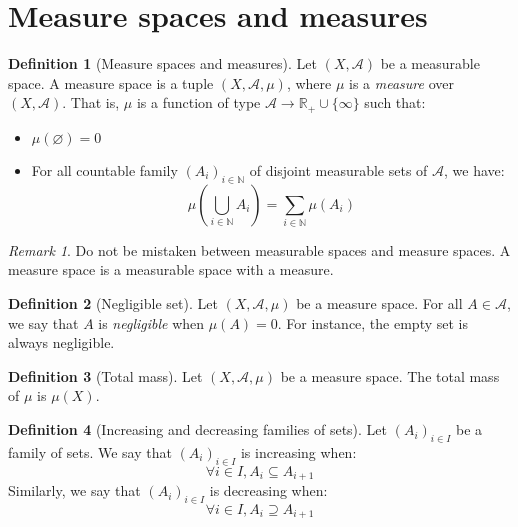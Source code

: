 \documentclass{article}
\theoremstyle{definition}
\newtheorem{definition}{Definition}[section]
\theoremstyle{remark}
\newtheorem*{remark}{Remark}
\theoremstyle{example}
\begin{document}
\section{Measure spaces and measures}

\begin{definition}[Measure spaces and measures]
    Let $(X, \mathcal{A})$ be a measurable space. A measure space is a tuple $(X, \mathcal{A}, \mu)$, where $\mu$ is a \textit{measure} over $(X, \mathcal{A})$. That is, $\mu$ is a function of type $\mathcal{A} \rightarrow \mathbb{R}_+ \cup \{\infty\}$ such that:
    \begin{itemize}
        \item $\mu(\varnothing) = 0$
        \item For all countable family $(A_i)_{i \in \mathbb{N}}$ of disjoint measurable sets of $\mathcal{A}$, we have:
            $$\mu(\bigcup_{i \in \mathbb{N}} A_i) = \sum_{i \in \mathbb{N}} \mu(A_i)$$
    \end{itemize}
\end{definition}

\begin{remark}
    Do not be mistaken between measurable spaces and measure spaces. A measure space is a measurable space with a measure.
\end{remark}

\begin{definition}[Negligible set]
    Let $(X, \mathcal{A}, \mu)$ be a measure space. For all $A \in \mathcal{A}$, we say that $A$ is \textit{negligible} when $\mu(A) = 0$. For instance, the empty set is always negligible.
\end{definition}

\begin{definition}[Total mass]
    Let $(X, \mathcal{A}, \mu)$ be a measure space. The total mass of $\mu$ is $\mu(X)$.
\end{definition}

\begin{definition}[Increasing and decreasing families of sets]
    Let $(A_i)_{i \in I}$ be a family of sets. We say that $(A_i)_{i \in I}$ is increasing when:
         $$\forall i \in I, A_i \subseteq A_{i+1}$$
    Similarly, we say that $(A_i)_{i \in I}$ is decreasing when:
         $$\forall i \in I, A_i \supseteq A_{i+1}$$
\end{definition}
\end{document}
